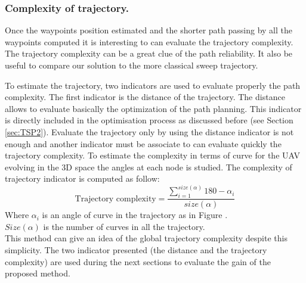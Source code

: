  
\subsubsection*{Complexity of trajectory. }\label{tarjectory}

Once the waypoints position estimated and the shorter path passing by all the waypoints computed it is interesting to can evaluate the trajectory complexity. The trajectory complexity can be a great clue of the path reliability.  It also be useful to compare our solution to the more classical sweep trajectory.
 
To estimate the trajectory, two indicators are used to evaluate properly the path complexity. The first indicator is the distance of the trajectory. The distance allows to evaluate basically the optimization of the path planning. This indicator is directly included in the optimisation process as discussed before (see Section \ref{sec:TSP2}). 
Evaluate the trajectory only by using the distance indicator is not enough and another indicator must be associate to can evaluate quickly the trajectory complexity. To estimate the complexity in terms of curve for the UAV evolving in the 3D space the angles at each node is studied. 
The complexity of trajectory indicator is computed as follow: 
\begin{equation}\label{Eq:trajectory}
\mbox{Trajectory complexity}=\frac{ \sum_{i=1}^{size(\alpha)} 180- \alpha_{i}  }{size(\alpha)}   
\end{equation}
Where $\alpha_i$ is an angle of curve in the trajectory as in Figure . \\
$Size(\alpha)$ is the number of curves in all the trajectory.\\ 
This method can give an idea of the global trajectory complexity despite this simplicity. 
The two indicator presented (the distance and the trajectory complexity) are used during the next sections to evaluate the gain of the proposed method.
	
